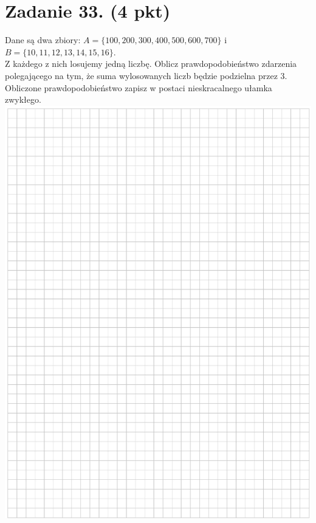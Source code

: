 \documentclass[10pt]{article}
\begin{document}
\section*{Zadanie 33. (4 pkt)}
Dane są dwa zbiory: \(A=\{100,200,300,400,500,600,700\}\) i \(B=\{10,11,12,13,14,15,16\}\).\\
Z każdego z nich losujemy jedną liczbę. Oblicz prawdopodobieństwo zdarzenia polegającego na tym, że suma wylosowanych liczb będzie podzielna przez 3. Obliczone prawdopodobieństwo zapisz w postaci nieskracalnego ułamka zwykłego.\\
\includegraphics[max width=\textwidth, center]{2024_11_21_9383c97fb44abf35abe9g-22}\\
\end{document}
